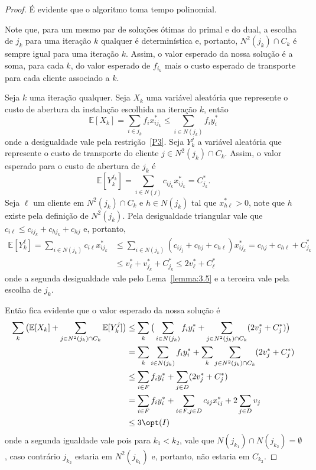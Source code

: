 \begin{proof}
É evidente que o algoritmo toma tempo polinomial.

Note que, para um mesmo par de soluções ótimas do primal e do dual, a escolha de $j_k$ para uma iteração $k$ qualquer é determinística e, portanto, $N^2(j_k) \cap C_k$ é sempre igual para uma iteração $k$. Assim, o valor esperado da nossa solução é a soma, para cada $k$, do valor esperado de $f_{i_k}$ mais o custo esperado de transporte para cada cliente associado a $k$. 

Seja $k$ uma iteração qualquer. Seja $X_k$ uma variável aleatória que represente o custo de abertura da instalação escolhida na iteração $k$, então
\[ \mathbb{E}[X_k] = \sum_{i \in j_k} f_i x^*_{ij_k} \leq \sum_{i \in N(j_k)} f_i y^*_i\]
onde a desigualdade vale pela restrição~\ref{P3}. Seja $Y_k^j$ a variável aleatória que represente o custo de transporte do cliente $j \in N^2(j_k) \cap C_k$. Assim, o valor esperado para o custo de abertura de $j_k$ é 
\[\mathbb{E}[Y_k^{j_k}] = \sum_{i \in N(j)} c_{ij_k} x^*_{ij_k} = C^*_{j_k}. \]
Seja $\ell$ um cliente em $N^2(j_k) \cap C_k$ e $h \in N(j_k)$ tal que $x^*_{h\ell} > 0$, note que $h$ existe pela definição de $N^2(j_k)$. Pela desigualdade triangular vale que $c_{i\ell} \leq c_{ij_k} + c_{hj_k} + c_{hj}$ e, portanto,
\begin{subequations} 
        \begin{align*}
        \mathbb{E}[Y_k^\ell] = \sum_{i \in N(j_k)} c_{i\ell}x^*_{ij_k} &\leq \sum_{i \in N(j_k)} (c_{ij_j} + c_{hj} + c_{h\ell})x^*_{ij_k} = c_{hj} + c_{h\ell} + C^*_{j_k}\\
        &\leq v^*_\ell + v^*_{j_k} + C^*_{j_k} \leq 2v^*_{\ell} + C^*_\ell 
        \end{align*}
\end{subequations}
onde a segunda desigualdade vale pelo Lema~\ref{lemma:3.5} e a terceira vale pela escolha de $j_k$.

Então fica evidente que o valor esperado da nossa solução é 
\begin{subequations}
        \begin{align*}
                \sum_k {\big (}\mathbb{E}[X_k] + \sum_{j \in N^2(j_k)\cap C_k}\mathbb{E}[Y_k^j] {\big )} &\leq \sum_k {\big (} \sum_{i \in N(j_k)}f_iy^*_i + \sum_{j \in N^2(j_k) \cap C_k} (2v^*_j + C^*_j) {\big )}  \\
                & = \sum_k \sum_{i \in N(j_k)}f_iy^*_i + \sum_k \sum_{j \in N^2(j_k)\cap C_k}(2v^*_j + C^*_j)\\
                &\leq\sum_{i \in F} f_iy^*_i + \sum_{j \in D }(2v^*_j + C^*_j)\\
                &= \sum_{i \in F} f_iy^*_i + \sum_{i \in F, j \in D} c_{ij}x^*_{ij} + 2\sum_{j \in D}v_j \\
                &\leq 3 \opt(I)
        \end{align*}
\end{subequations}
onde a segunda igualdade vale pois para $k_1 < k_2$, vale que $N(j_{k_1}) \cap N(j_{k_2}) = \emptyset$, caso contrário $j_{k_2}$ estaria em $N^2(j_{k_1})$ e, portanto, não estaria em $C_{k_2}$.
\end{proof}

